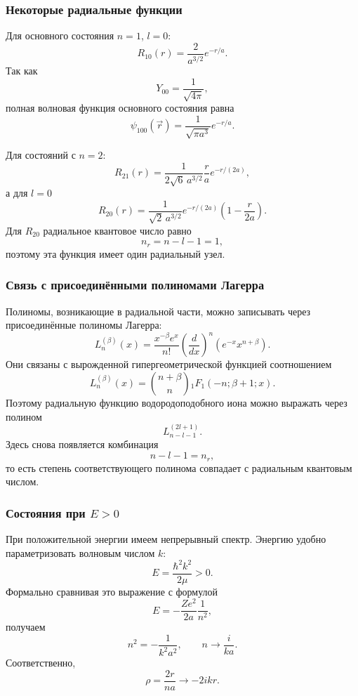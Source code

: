 \documentclass[12pt,a4paper]{article}
\begin{document}
\subsubsection{Некоторые радиальные функции}

Для основного состояния $n=1$, $l=0$:
\[
    \boxed{
        R_{10}(r)
        =
        \frac{2}{a^{3/2}}e^{-r/a}
    }.
\]
Так как
\[
    Y_{00}=\frac{1}{\sqrt{4\pi}},
\]
полная волновая функция основного состояния равна
\[
    \boxed{
        \psi_{100}(\vec r)
        =
        \frac{1}{\sqrt{\pi a^3}}e^{-r/a}
    }.
\]

Для состояний с $n=2$:
\[
    \boxed{
    R_{21}(r)
    =
    \frac{1}{2\sqrt6\,a^{3/2}}
    \frac{r}{a}
    e^{-r/(2a)}
    },
\]
а для $l=0$
\[
    \boxed{
    R_{20}(r)
    =
    \frac{1}{\sqrt2\,a^{3/2}}
    e^{-r/(2a)}
    \left(
        1-\frac{r}{2a}
    \right)
    }.
\]
Для $R_{20}$ радиальное квантовое число равно
\[
    n_r=n-l-1=1,
\]
поэтому эта функция имеет один радиальный узел.

\subsubsection{Связь с присоединёнными полиномами Лагерра}

Полиномы, возникающие в радиальной части, можно записывать через
присоединённые полиномы Лагерра:
\[
    \boxed{
    L_n^{(\beta)}(x)
    =
    \frac{x^{-\beta}e^x}{n!}
    \left(
        \frac{d}{dx}
    \right)^n
    \left(
        e^{-x}x^{n+\beta}
    \right)
    }.
\]
Они связаны с вырожденной гипергеометрической функцией соотношением
\[
    \boxed{
    L_n^{(\beta)}(x)
    =
    \binom{n+\beta}{n}
    {}_1F_1(-n;\beta+1;x)
    }.
\]
Поэтому радиальную функцию водородоподобного иона можно выражать через
полином
\[
    L_{n-l-1}^{(2l+1)}.
\]
Здесь снова появляется комбинация
\[
    n-l-1=n_r,
\]
то есть степень соответствующего полинома совпадает с радиальным
квантовым числом.


\subsubsection{Состояния при \texorpdfstring{$E>0$}{E>0}}

При положительной энергии имеем непрерывный спектр. Энергию удобно
параметризовать волновым числом $k$:
\[
    \boxed{
        E=\frac{\hbar^2k^2}{2\mu}>0
    }.
\]
Формально сравнивая это выражение с формулой
\[
    E
    =
    -\frac{Ze^2}{2a}\frac{1}{n^2},
\]
получаем
\[
    n^2=-\frac{1}{k^2a^2},
    \qquad
    n\longrightarrow\frac{i}{ka}.
\]
Соответственно,
\[
    \rho
    =
    \frac{2r}{na}
    \longrightarrow
    -2ikr.
\]
\end{document}

